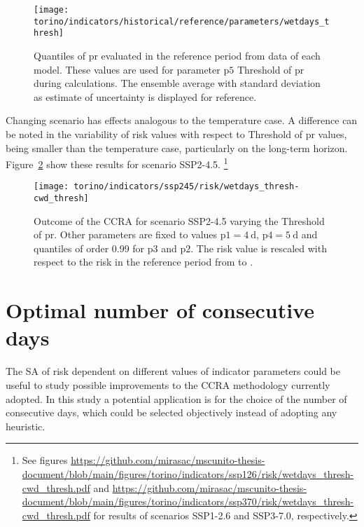 \begin{figure}
  \centering
  \texttt{[image: torino/indicators/historical/reference/parameters/wetdays\_thresh]}
  \caption{Quantiles of \gls{pr} evaluated in the reference period from data of each model. These values are used for parameter $\mathrm{p5}$ {Threshold of \gls{pr}} during calculations. The ensemble average with standard deviation as estimate of uncertainty is displayed for reference.}
  \label{fig:parameters_wetdays_thresh}
\end{figure}

Changing scenario has effects analogous to the temperature case. A difference can be noted in the variability of risk values with respect to {Threshold of \gls{pr}} values, being smaller than the temperature case, particularly on the long-term horizon.
Figure~\ref{fig:ssp245_risk_wetdays_thresh-cwd_thresh} show these results for scenario SSP2-4.5.%
\footnote{See figures \url{https://github.com/mirasac/mscunito-thesis-document/blob/main/figures/torino/indicators/ssp126/risk/wetdays_thresh-cwd_thresh.pdf} and \url{https://github.com/mirasac/mscunito-thesis-document/blob/main/figures/torino/indicators/ssp370/risk/wetdays_thresh-cwd_thresh.pdf} for results of scenarios SSP1-2.6 and SSP3-7.0, respectively.}

\begin{figure}
  \centering
  \texttt{[image: torino/indicators/ssp245/risk/wetdays\_thresh-cwd\_thresh]}
  \caption{Outcome of the \gls{CCRA} for scenario SSP2-4.5 varying the {Threshold of \gls{pr}}. Other parameters are fixed to values $\mathrm{p1} = \qty{4}{\day}$, $\mathrm{p4} = \qty{5}{\day}$ and quantiles of order 0.99 for $\mathrm{p3}$ and $\mathrm{p2}$. The risk value is rescaled with respect to the risk in the reference period from  to .}
  \label{fig:ssp245_risk_wetdays_thresh-cwd_thresh}
\end{figure}



\section{Optimal number of consecutive days}
The \gls{SA} of risk dependent on different values of indicator parameters could be useful to study possible improvements to the \gls{CCRA} methodology currently adopted. In this study a potential application is for the choice of the number of consecutive days, which could be selected objectively instead of adopting any heuristic.

